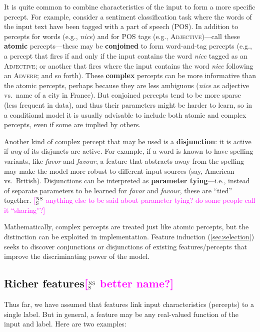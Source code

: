 \documentclass[11pt,letterpaper]{article}
\newcommand{\ensuretext}[1]{#1}
\newcommand{\nssmarker}{\ensuretext{\textcolor{magenta}{\ensuremath{^{\textsc{NS}}_{\textsc{S}}}}}}
\newcommand{\arkcomment}[3]{\ensuretext{\textcolor{#3}{[#1 #2]}}}
\newcommand{\nss}[1]{\arkcomment{\nssmarker}{#1}{magenta}}
\begin{document}
It is quite common to combine characteristics of the input to form a more specific percept.
For example, consider a sentiment classification task where the words of the input text have been 
tagged with a part of speech (POS). In addition to percepts for words (e.g., \textit{nice}) 
and for POS tags (e.g., \textsc{Adjective})---call these \textbf{atomic} percepts---these may be 
\textbf{conjoined} to form word-and-tag percepts (e.g., a percept that fires if and only if the input contains 
the word \textit{nice} tagged as an \textsc{Adjective}; or another that fires where the input contains 
the word \textit{nice} following an \textsc{Adverb}; and so forth).
These \textbf{complex} percepts can be more informative than the atomic percepts, 
perhaps because they are less ambiguous (\textit{nice} as adjective vs.~name of a city in France).
But conjoined percepts tend to be more sparse (less frequent in data), and thus their parameters might be harder to learn, 
so in a conditional model it is usually advisable to include both atomic and complex percepts, 
even if some are implied by others.

Another kind of complex percept that may be used is a \textbf{disjunction}: it is active if 
{\em any} of its disjuncts are active. For example, if a word is known to have spelling variants, 
like \textit{favor} and \textit{favour}, a feature that abstracts away from the spelling 
may make the model more robust to different input sources (say, American vs.~British).
Disjunctions can be interpreted as \textbf{parameter tying}---i.e., instead of separate parameters 
to be learned for \textit{favor} and \textit{favour}, these are ``tied'' together.
\nss{anything else to be said about parameter tying? do some people call it ``sharing''?}

Mathematically, complex percepts are treated just like atomic percepts, 
but the distinction can be exploited in implementation.
Feature induction (\cref{sec:selection}) seeks to discover conjunctions or disjunctions of 
existing features/percepts that improve the discriminating power of the model.


\subsection{Richer features\nss{better name?}}\label{sec:richer}

Thus far, we have assumed that features link input characteristics (percepts) 
to a single label. But in general, a feature may be any real-valued function of the input and label.
Here are two examples:
\end{document}
